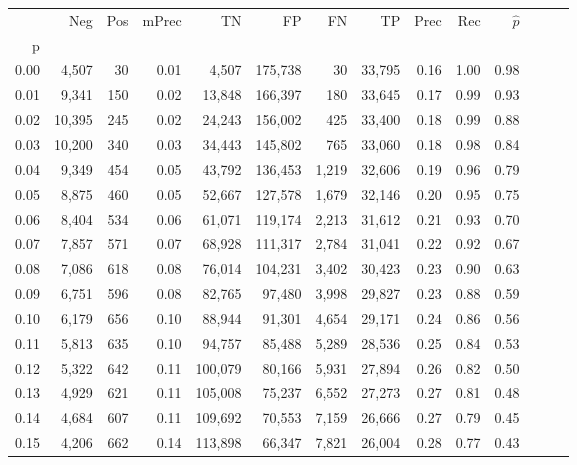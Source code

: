 \begin{tabular}{rrrrrrrrrrrrrr}
\toprule
{} &     Neg &  Pos & mPrec &       TN &       FP &      FN &      TP &  Prec &   Rec & $\hat{p}$ \\
p    &         &      &       &          &          &         &         &       &       &           \\
\midrule
0.00 &   4,507 &   30 &  0.01 &    4,507 &  175,738 &      30 &  33,795 &  0.16 &  1.00 &      0.98 \\
0.01 &   9,341 &  150 &  0.02 &   13,848 &  166,397 &     180 &  33,645 &  0.17 &  0.99 &      0.93 \\
0.02 &  10,395 &  245 &  0.02 &   24,243 &  156,002 &     425 &  33,400 &  0.18 &  0.99 &      0.88 \\
0.03 &  10,200 &  340 &  0.03 &   34,443 &  145,802 &     765 &  33,060 &  0.18 &  0.98 &      0.84 \\
0.04 &   9,349 &  454 &  0.05 &   43,792 &  136,453 &   1,219 &  32,606 &  0.19 &  0.96 &      0.79 \\
0.05 &   8,875 &  460 &  0.05 &   52,667 &  127,578 &   1,679 &  32,146 &  0.20 &  0.95 &      0.75 \\
0.06 &   8,404 &  534 &  0.06 &   61,071 &  119,174 &   2,213 &  31,612 &  0.21 &  0.93 &      0.70 \\
0.07 &   7,857 &  571 &  0.07 &   68,928 &  111,317 &   2,784 &  31,041 &  0.22 &  0.92 &      0.67 \\
0.08 &   7,086 &  618 &  0.08 &   76,014 &  104,231 &   3,402 &  30,423 &  0.23 &  0.90 &      0.63 \\
0.09 &   6,751 &  596 &  0.08 &   82,765 &   97,480 &   3,998 &  29,827 &  0.23 &  0.88 &      0.59 \\
0.10 &   6,179 &  656 &  0.10 &   88,944 &   91,301 &   4,654 &  29,171 &  0.24 &  0.86 &      0.56 \\
0.11 &   5,813 &  635 &  0.10 &   94,757 &   85,488 &   5,289 &  28,536 &  0.25 &  0.84 &      0.53 \\
0.12 &   5,322 &  642 &  0.11 &  100,079 &   80,166 &   5,931 &  27,894 &  0.26 &  0.82 &      0.50 \\
0.13 &   4,929 &  621 &  0.11 &  105,008 &   75,237 &   6,552 &  27,273 &  0.27 &  0.81 &      0.48 \\
0.14 &   4,684 &  607 &  0.11 &  109,692 &   70,553 &   7,159 &  26,666 &  0.27 &  0.79 &      0.45 \\
0.15 &   4,206 &  662 &  0.14 &  113,898 &   66,347 &   7,821 &  26,004 &  0.28 &  0.77 &      0.43 \\

\end{tabular}
